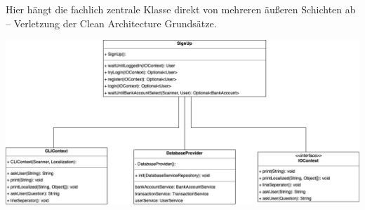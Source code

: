 Hier hängt die fachlich zentrale Klasse direkt von mehreren äußeren Schichten ab – Verletzung der Clean Architecture Grundsätze.
\newline

\includegraphics[width=\linewidth]{kapitel2_architektur/DepNulReg2.drawio.png}